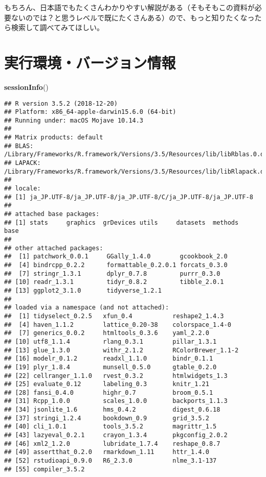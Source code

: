 \documentclass[]{book}
\newenvironment{Shaded}{\begin{snugshade}}{\end{snugshade}}
\newcommand{\KeywordTok}[1]{\textcolor[rgb]{0.13,0.29,0.53}{\textbf{#1}}}
\newcommand{\NormalTok}[1]{#1}
\begin{document}
もちろん、日本語でもたくさんわかりやすい解説がある（そもそもこの資料が必要ないのでは？と思うレベルで既にたくさんある）ので、もっと知りたくなったら検索して調べてみてほしい。

\chapter*{実行環境・バージョン情報}

\begin{Shaded}
\begin{Highlighting}[]
\KeywordTok{sessionInfo}\NormalTok{()}
\end{Highlighting}
\end{Shaded}

\begin{verbatim}
## R version 3.5.2 (2018-12-20)
## Platform: x86_64-apple-darwin15.6.0 (64-bit)
## Running under: macOS Mojave 10.14.3
## 
## Matrix products: default
## BLAS: /Library/Frameworks/R.framework/Versions/3.5/Resources/lib/libRblas.0.dylib
## LAPACK: /Library/Frameworks/R.framework/Versions/3.5/Resources/lib/libRlapack.dylib
## 
## locale:
## [1] ja_JP.UTF-8/ja_JP.UTF-8/ja_JP.UTF-8/C/ja_JP.UTF-8/ja_JP.UTF-8
## 
## attached base packages:
## [1] stats     graphics  grDevices utils     datasets  methods   base     
## 
## other attached packages:
##  [1] patchwork_0.0.1     GGally_1.4.0        gcookbook_2.0      
##  [4] bindrcpp_0.2.2      formattable_0.2.0.1 forcats_0.3.0      
##  [7] stringr_1.3.1       dplyr_0.7.8         purrr_0.3.0        
## [10] readr_1.3.1         tidyr_0.8.2         tibble_2.0.1       
## [13] ggplot2_3.1.0       tidyverse_1.2.1    
## 
## loaded via a namespace (and not attached):
##  [1] tidyselect_0.2.5   xfun_0.4           reshape2_1.4.3    
##  [4] haven_1.1.2        lattice_0.20-38    colorspace_1.4-0  
##  [7] generics_0.0.2     htmltools_0.3.6    yaml_2.2.0        
## [10] utf8_1.1.4         rlang_0.3.1        pillar_1.3.1      
## [13] glue_1.3.0         withr_2.1.2        RColorBrewer_1.1-2
## [16] modelr_0.1.2       readxl_1.1.0       bindr_0.1.1       
## [19] plyr_1.8.4         munsell_0.5.0      gtable_0.2.0      
## [22] cellranger_1.1.0   rvest_0.3.2        htmlwidgets_1.3   
## [25] evaluate_0.12      labeling_0.3       knitr_1.21        
## [28] fansi_0.4.0        highr_0.7          broom_0.5.1       
## [31] Rcpp_1.0.0         scales_1.0.0       backports_1.1.3   
## [34] jsonlite_1.6       hms_0.4.2          digest_0.6.18     
## [37] stringi_1.2.4      bookdown_0.9       grid_3.5.2        
## [40] cli_1.0.1          tools_3.5.2        magrittr_1.5      
## [43] lazyeval_0.2.1     crayon_1.3.4       pkgconfig_2.0.2   
## [46] xml2_1.2.0         lubridate_1.7.4    reshape_0.8.7     
## [49] assertthat_0.2.0   rmarkdown_1.11     httr_1.4.0        
## [52] rstudioapi_0.9.0   R6_2.3.0           nlme_3.1-137      
## [55] compiler_3.5.2
\end{verbatim}


\end{document}
